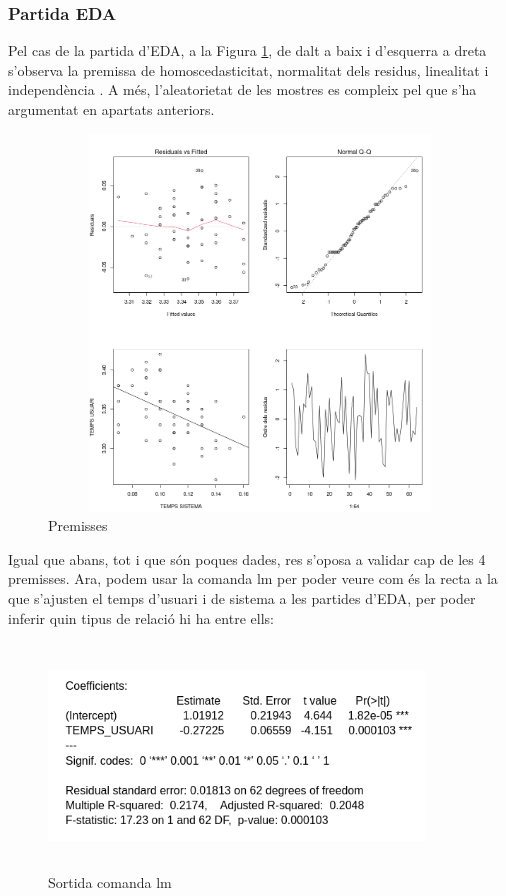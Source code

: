 \documentclass[12pt]{article}
\begin{document}
\hfill \break
\subsubsection{Partida EDA}
Pel cas de la partida d'EDA, a la Figura \ref{fig:prem3}, de dalt a baix i d'esquerra a dreta s'observa la premissa
de homoscedasticitat, normalitat dels residus, linealitat i independència . A més, l'aleatorietat de les mostres es compleix pel que s'ha 
argumentat en apartats anteriors.

\begin{figure}[h!]
  \centering
  \includegraphics[width=15cm, height=10cm]{prem3.png}
  \caption{Premisses}
  \label{fig:prem3}
\end{figure} 

Igual que abans, tot i que són poques dades, res s'oposa a validar cap de les 4 premisses.
\hfill \break
Ara, podem usar la comanda lm per poder veure com és la recta a la que s'ajusten el temps d'usuari i de sistema a les
partides d'EDA, per poder inferir quin tipus de relació hi ha entre ells:

\begin{figure}[h!]
  \centering
  \includegraphics[width=10cm, height=6cm]{lm3.png}
  \caption{Sortida comanda lm}
  \label{fig:lm3}
\end{figure} 
\end{document}
